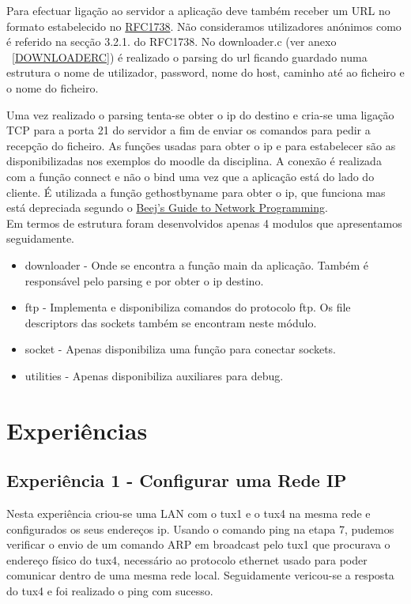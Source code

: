 \documentclass[11pt,a4paper,reqno]{report}
\numberwithin{equation}{section}
\begin{document}
Para efectuar ligação ao servidor a aplicação deve também receber um URL no formato estabelecido no  \href{https://www.ietf.org/rfc/rfc1738.txt}{RFC1738}. Não consideramos utilizadores anónimos como é referido na secção 3.2.1. do RFC1738. No downloader.c (ver anexo ~\ref{DOWNLOADERC}) é realizado o parsing do url ficando guardado numa estrutura o nome de utilizador, password, nome do host, caminho até ao ficheiro e o nome do ficheiro.

Uma vez realizado o parsing tenta-se obter o ip do destino e cria-se uma ligação TCP para a porta 21 do servidor a fim de enviar os comandos para pedir a recepção do ficheiro. As funções usadas para obter o ip e para estabelecer são as disponibilizadas nos exemplos do moodle da disciplina. A conexão é realizada com a função connect e não o bind uma vez que a aplicação está do lado do cliente. É utilizada a função gethostbyname para obter o ip, que funciona mas está depreciada segundo o \href{ http://beej.us/guide/bgnet/output/html/multipage/index.html}{Beej's Guide to Network Programming}.\\

Em termos de estrutura foram desenvolvidos apenas 4 modulos que apresentamos seguidamente.
\begin{itemize} 
\item downloader - Onde se encontra a função main da aplicação. Também é responsável pelo parsing e por obter o ip destino.
\item ftp -  Implementa e disponibiliza comandos do protocolo ftp. Os file descriptors das sockets também se encontram neste módulo.
\item socket - Apenas disponibiliza uma função para conectar sockets.
\item utilities - Apenas disponibiliza auxiliares para debug.
\end{itemize}

\chapter{Experiências}

\section{Experiência 1 - Configurar uma Rede IP}

Nesta experiência criou-se uma LAN com o tux1 e o tux4 na mesma rede e configurados os seus endereços ip. Usando o comando ping na etapa 7, pudemos verificar o envio de um comando ARP em broadcast pelo tux1 que procurava o endereço físico do tux4, necessário ao protocolo ethernet usado para poder comunicar dentro de uma mesma rede local. Seguidamente vericou-se a resposta do tux4 e foi realizado o ping com sucesso.
\end{document}
